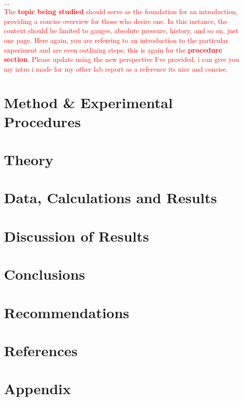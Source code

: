 \documentclass{article}
\begin{document}
\\[1em]	
	\Huge$\ldots$
	\large
\\[1em]
	\noindent
	\textcolor{red}{The \textbf{topic being studied} should serve as the foundation for an introduction, providing a concise overview for those who desire one.  In this instance, the context should be limited to gauges, absolute pressure, history, and so on, just one page.  Here again, you are referring to an introduction to the particular experiment and are even outlining steps; this is again for the \textbf{procedure section}. Please update using the new perspective I've provided, i can give you my intro i made for my other lab report as a reference its nice and concise.}\\[1em]

	
	\newpage\vspace*{-20pt}
	\section{Method \& Experimental Procedures}
	
	\newpage
	\section{Theory}
	
	\newpage	
	\section{Data, Calculations and Results}
	
	\newpage
	\section{Discussion of Results}
	
	\newpage\vspace*{-30pt}
	\section{Conclusions}
	\newpage\vspace*{-30pt}
	
	\section{Recommendations}  		
	\newpage\vspace*{-30pt}
	
	
	\section{References}		
	\newpage\vspace*{-30pt}
	
	
	\section{Appendix}
	
\end{document}
